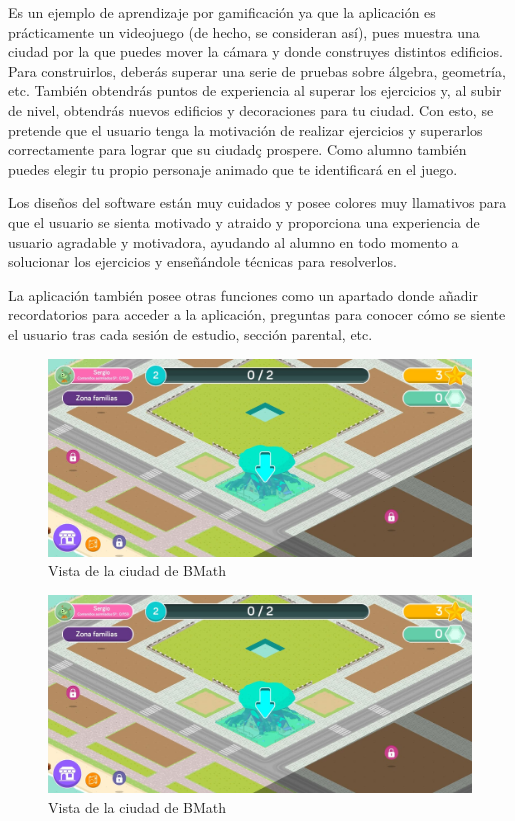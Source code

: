 Es un ejemplo de aprendizaje por gamificación ya que la aplicación es prácticamente un videojuego (de hecho, se consideran así), pues muestra una ciudad
por la que puedes mover la cámara y donde construyes distintos edificios. Para construirlos, deberás superar
una serie de pruebas sobre álgebra, geometría, etc. También obtendrás puntos de experiencia al superar los ejercicios y, al subir de nivel, obtendrás nuevos edificios y decoraciones para tu ciudad.
Con esto, se pretende que el usuario tenga la motivación de realizar ejercicios y superarlos correctamente para lograr que su ciudadç
prospere. Como alumno también puedes elegir tu propio personaje animado que te identificará en el juego.

Los diseños del software están muy cuidados y posee colores muy llamativos para que el usuario se sienta motivado y atraido y proporciona una experiencia 
de usuario agradable y motivadora, ayudando al alumno en todo momento 
a solucionar los ejercicios y enseñándole técnicas para resolverlos.

La aplicación también posee otras funciones como un apartado donde añadir recordatorios para acceder a la aplicación, preguntas para conocer cómo se siente el usuario tras cada sesión de estudio, sección parental, etc.

\begin{figure}[H]
    \centering
    \includegraphics[width=\textwidth]{imagenes/c2/bmath.jpeg}
    \caption{Vista de la ciudad de BMath}
\end{figure}

\begin{figure}[H]
    \centering
    \includegraphics[width=\textwidth]{imagenes/c2/bmath.jpeg}
    \caption{Vista de la ciudad de BMath}
\end{figure}


